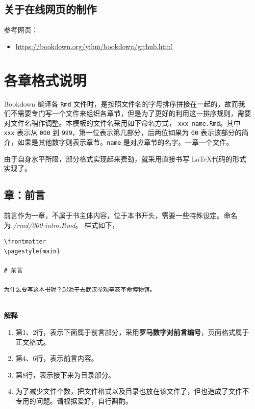 \documentclass[doctor,openright,twoside]{sjtuthesis}
\providecommand{\tightlist}{%
    \setlength{\itemsep}{0pt}\setlength{\parskip}{0pt}}
\newcommand{\passthrough}[1]{#1}
\theoremstyle{plain}
\theoremstyle{definition}
\theoremstyle{remark}
\theoremstyle{ocrenumbox}
\theoremstyle{plain}
\begin{document}
\hypertarget{section-152}{%
\section{关于在线网页的制作}\label{section-152}}

参考网页：

\begin{itemize}
\tightlist
\item
  \url{https://bookdown.org/yihui/bookdown/github.html}
\end{itemize}

\hypertarget{chap:chapters}{%
\chapter{各章格式说明}\label{chap:chapters}}

Bookdown 编译各 \passthrough{\lstinline!Rmd!} 文件时，是按照文件名的字母排序拼接在一起的，故而我们不需要专门写一个文件来组织各章节，但是为了更好的利用这一排序规则，需要对文件名稍作调整。本模板的文件名采用如下命名方式， \passthrough{\lstinline!xxx-name.Rmd!}。其中 \passthrough{\lstinline!xxx!} 表示从 \passthrough{\lstinline!000!} 到 \passthrough{\lstinline!999!}，第一位表示第几部分，后两位如果为 \passthrough{\lstinline!00!} 表示该部分的简介，如果是其他数字则表示章节。\passthrough{\lstinline!name!} 是对应章节的名字。一章一个文件。

由于自身水平所限，部分格式实现起来费劲，就采用直接书写 \LaTeX 代码的形式实现了。

\hypertarget{section-153}{%
\section{章：前言}\label{section-153}}

前言作为一章，不属于书主体内容，位于本书开头，需要一些特殊设定。命名为\emph{./rmd/000-intro.Rmd}。 样式如下，

\begin{lstlisting}[caption=前言示例, label={chapters:intro}]
\frontmatter
\pagestyle{main}

# 前言

为什么要写这本书呢？起源于去武汉参观辛亥革命博物馆。


\end{lstlisting}

\textbf{解释}

\begin{enumerate}
\def\labelenumi{\arabic{enumi}.}
\tightlist
\item
  第1、2行，表示下面属于前言部分，采用\textbf{罗马数字对前言编号}，页面格式属于正文格式。
\item
  第4、6行，表示前言内容。
\item
  第8行，表示接下来为目录部分。
\item
  为了减少文件个数，把文件格式以及目录也放在该文件了，但也造成了文件不专用的问题。请根据爱好，自行斟酌。
\end{enumerate}
\end{document}
